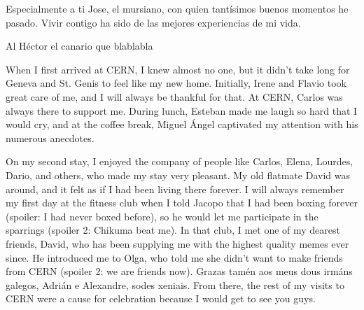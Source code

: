 Especialmente a ti Jose, el mursiano, con quien tantísimos buenos momentos he pasado. 
Vivir contigo ha sido de las mejores experiencias de mi vida.

Al Héctor el canario que blablabla



When I first arrived at CERN, I knew almost no one, but it didn't take long for Geneva and St. Genis to feel like my new home. Initially, Irene and Flavio took great care of me, and I will always be thankful for that. At CERN, Carlos was always there to support me. During lunch, Esteban made me laugh so hard that I would cry, and at the coffee break, Miguel Ángel captivated my attention with his numerous anecdotes.
 
On my second stay, I enjoyed the company of people like Carlos, Elena, Lourdes, Dario, and others, who made my stay very pleasant. My old flatmate David was around, and it felt as if I had been living there forever. I will always remember my first day at the fitness club when I told Jacopo that I had been boxing forever (spoiler: I had never boxed before), so he would let me participate in the sparrings (spoiler 2: Chikuma beat me). In that club, I met one of my dearest friends, David, who has been supplying me with the highest quality memes ever since. He introduced me to Olga, who told me she didn't want to make friends from CERN (spoiler 2: we are friends now).
Grazas tamén aos meus dous irmáns galegos, Adrián e Alexandre, sodes xeniais.
From there, the rest of my visits to CERN were a cause for celebration because I would get to see you guys. 


 





